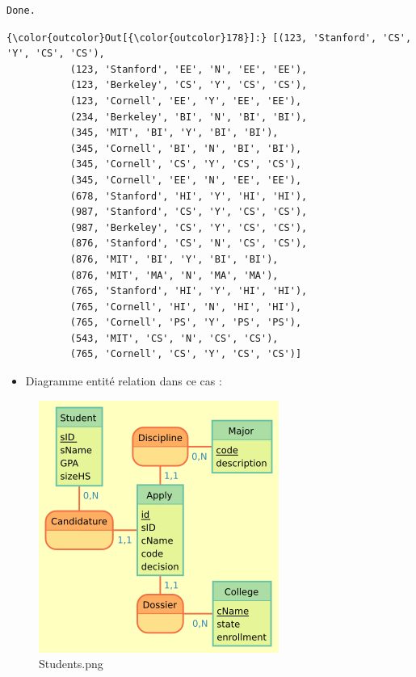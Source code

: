 \documentclass[11pt]{article}
\makeatletter
\def\maxwidth{\ifdim\Gin@nat@width>\linewidth\linewidth
    \else\Gin@nat@width\fi}
\let\Oldincludegraphics\includegraphics
\renewcommand{\includegraphics}[1]{\Oldincludegraphics[width=.8\maxwidth]{#1}}
\providecommand{\tightlist}{%
      \setlength{\itemsep}{0pt}\setlength{\parskip}{0pt}}
\makeatother
\begin{document}
    \begin{Verbatim}[commandchars=\\\{\}]
Done.

    \end{Verbatim}

\begin{Verbatim}[commandchars=\\\{\}]
{\color{outcolor}Out[{\color{outcolor}178}]:} [(123, 'Stanford', 'CS', 'Y', 'CS', 'CS'),
           (123, 'Stanford', 'EE', 'N', 'EE', 'EE'),
           (123, 'Berkeley', 'CS', 'Y', 'CS', 'CS'),
           (123, 'Cornell', 'EE', 'Y', 'EE', 'EE'),
           (234, 'Berkeley', 'BI', 'N', 'BI', 'BI'),
           (345, 'MIT', 'BI', 'Y', 'BI', 'BI'),
           (345, 'Cornell', 'BI', 'N', 'BI', 'BI'),
           (345, 'Cornell', 'CS', 'Y', 'CS', 'CS'),
           (345, 'Cornell', 'EE', 'N', 'EE', 'EE'),
           (678, 'Stanford', 'HI', 'Y', 'HI', 'HI'),
           (987, 'Stanford', 'CS', 'Y', 'CS', 'CS'),
           (987, 'Berkeley', 'CS', 'Y', 'CS', 'CS'),
           (876, 'Stanford', 'CS', 'N', 'CS', 'CS'),
           (876, 'MIT', 'BI', 'Y', 'BI', 'BI'),
           (876, 'MIT', 'MA', 'N', 'MA', 'MA'),
           (765, 'Stanford', 'HI', 'Y', 'HI', 'HI'),
           (765, 'Cornell', 'HI', 'N', 'HI', 'HI'),
           (765, 'Cornell', 'PS', 'Y', 'PS', 'PS'),
           (543, 'MIT', 'CS', 'N', 'CS', 'CS'),
           (765, 'Cornell', 'CS', 'Y', 'CS', 'CS')]
\end{Verbatim}
            
    \begin{itemize}
\tightlist
\item
  Diagramme entité relation dans ce cas :
\end{itemize}

\begin{figure}
\centering
\includegraphics{mocodo/Stanford2/Students.png}
\caption{Students.png}
\end{figure}
\end{document}
